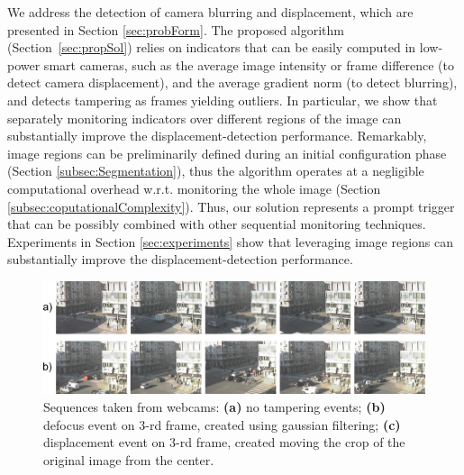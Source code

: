 \documentclass{llncs}
\begin{document}
We address the detection of camera blurring and displacement, which are presented in Section \ref{sec:probForm}. The proposed algorithm (Section~\ref{sec:propSol}) relies on indicators that can be easily computed in low-power smart cameras, such as the average image intensity or frame difference (to detect camera displacement), and the average gradient norm (to detect blurring), and detects tampering as frames yielding outliers. In particular, we show that separately monitoring indicators over different regions of the image can substantially improve the displacement-detection performance. Remarkably, image regions can be preliminarily defined during an initial configuration phase (Section \ref{subsec:Segmentation}), thus the algorithm operates at a negligible computational overhead w.r.t. monitoring the whole image (Section \ref{subsec:coputationalComplexity}). Thus, our solution represents a prompt trigger that can be possibly combined with other sequential monitoring techniques. Experiments in Section \ref{sec:experiments} show that leveraging image regions can substantially improve the displacement-detection performance. %
\begin{figure}[t]
\centering
\includegraphics[width=1\linewidth]{Immagini/sequenze}
\caption{Sequences taken from webcams: \textbf{(a)} no tampering events; \textbf{(b)} defocus event on 3-rd frame, created using gaussian filtering; \textbf{(c)} displacement event on 3-rd frame, created moving the crop of the original image from the center.}
\label{fig:sequences}
\end{figure}



% 
%
%
%
\end{document}
